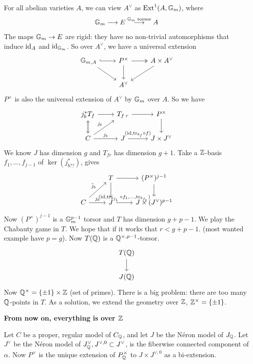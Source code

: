 For all abelian varieties $A$, we can view $A^\vee$ as $\operatorname{Ext}^1(A,\mathbb{G}_m)$, where
	\[
	\mathbb{G}_m \stackrel{}{\longrightarrow} E \stackrel{\mathbb{G}_m \text{ torsor}}{\longrightarrow} A
	\]
The maps $\mathbb{G}_m \to E$ are rigid: they have no non-trivial automorphisms that induce $\operatorname{id}_A$ and $\operatorname{id}_{\mathbb{G}_m}$. So over $A^\vee$, we have a universal extension 
	\[
	\begin{tikzcd}
	\G_{m,A} \arrow[hook]{r} \arrow{dr} & P^\times \arrow{d} \arrow[two heads]{r} &  A \times A^\vee \arrow{dl} \\
	& A^\vee & 
	\end{tikzcd}
	\]
$P^\times$ is also the universal extension of $A^\vee$ by $\mathbb{G}_m$ over $A$. So we have
	\[
	\begin{tikzcd}
	j_b^* T_{f} \arrow{r} \arrow{d} & T_{f \; r} \arrow{r} & P^\times \arrow{d} \\
	C \arrow{r}{j_b} \arrow{u} \arrow{ur}{j_b} & J \arrow{r}{(\id, \text{tr}_{b_f} \circ f)} & J \times J^\vee
	\end{tikzcd}
	\]
We know $J$ has dimension $g$ and $T_{f r}$ has dimension $g+1$. Take a $\mathbb{Z}$-basis $f_1, \ldots, f_{j-1}$ of $\ker(j_{b??}^*)$, gives
	\[
	\begin{tikzcd}
	& T \arrow{r} \arrow{d} &  (P^\times)^{j-1} \arrow{d} \\
	C \arrow{r}{j_b} \arrow{ur}{\tilde{j}_b} & J \arrow{r}{(\id,\tr_{b_{f_1}} \circ f_1, \ldots, \tr_{b_{f_1}})} & J \times (J^\vee)^{p-1} 
	\end{tikzcd}
	\]
Now $(P^\times)^{j-1}$ is a $\mathbb{G}_m^{p-1}$ torsor and $T$ has dimension $g+p-1$. We play the Chabauty game in $T$. We hope that if it works that $r< g+p-1$. (most wanted example have $p= g$). Now $T(\mathbb{Q})$ is a $\mathbb{Q}^{\times,p-1}$-torsor.
	\[
	\begin{tikzcd}
	T(\Q) \arrow{d} \\
	J(\Q)
	\end{tikzcd}
	\]
Now $\mathbb{Q}^\times= \{\pm 1\} \times \mathbb{Z}$ (set of primes). There is a big problem: there are too many $\mathbb{Q}$-points in $T$. As a solution, we extend the geometry over $\mathbb{Z}$, $\mathbb{Z}^\times= \{\pm1\}$. 


\begin{rem}
{\bfseries From now on, everything is over $\mathbb{Z}$}
\end{rem}


Let $C$ be a proper, regular model of $C_{\mathbb{Q}}$, and let $J$ be the N\'eron model of $J_{\mathbb{Q}}$. Let $J^\vee$ be the N\'eron model of $J_{\mathbb{Q}}^\vee, J^{\vee,0} \subset J^\vee$, is the fiberwise connected component of $\alpha$. Now $P^\times$ is the unique extension of $P^\times_{\mathbb{Q}}$ to $J \times J^{\vee,0}$ as a bi-extension.


